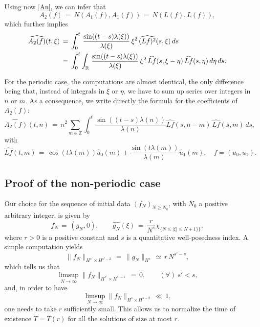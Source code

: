 \documentclass{amsart}
\begin{document}
Using now \eqref{An}, we can infer that
\[
A_2(f)\,=\,N(A_1(f),A_1(f))\,=\,N(L(f),L(f)),\]
which further implies
\begin{equation}
\aligned
\widehat{A_2(f)}(t,\xi)\,&=\,\int_0^t\,\frac{\sin((t-s) \lambda(\xi))}{\lambda(\xi)}\, \xi^2\, \widehat{(Lf)^2}(s,\xi)\,ds\\
&=\,\int_0^t \int_{\mathbb{R}}\,\frac{\sin((t-s) \lambda(\xi))}{\lambda(\xi)}\, \xi^2\, \widehat{Lf}(s,\xi-\eta)\,\widehat{Lf}(s,\eta)\,d\eta\,ds.\endaligned
\label{A2f}
\end{equation}

For the periodic case, the computations are almost identical, the only difference being that, instead of integrals in $\xi$ or $\eta$, we have to sum up series over integers in $n$ or $m$. As a consequence, we write directly the formula for the coefficients of $A_2(f)$:
\begin{equation}
\widehat{A_2(f)}(t,n)\,=\, n^2 \sum_{m\in\mathbb{Z}} \int_0^t \frac{\sin((t-s) \lambda(n))}{\lambda(n)} \widehat{Lf}(s,n-m)\,\widehat{Lf}(s,m)\,ds,
\label{A2p}\end{equation}
with
\[
\widehat{Lf}(t,m)\,=\,\cos(t \lambda(m)) \hat{u}_0(m)+\frac{\sin(t \lambda(m))}{\lambda(m)} \hat{u}_1(m),\quad f=(u_0,u_1).\]


\subsection{Proof of the non-periodic case} Our choice for the sequence of initial data $(f_N)_{N\geq N_0}$, with $N_0$ a positive arbitrary integer, is given by
\begin{equation}
f_N\,=\,(g_N, 0), \qquad \widehat{g_N}(\xi)\,=\,\frac{r}{N^s} \chi_{\{N \leq |\xi| \leq N + 1\}\}},
\label{fn}
\end{equation}
where $r>0$ is a positive constant and $s$ is a quantitative well-posedness index. A simple computation yields
\begin{equation}
\|f_N\|_{H^{s'}\times H^{s'-2}}\,=\,\|g_N\|_{H^s}\,\simeq\,r\,N^{s'-s},
\label{hsfn}
\end{equation}
which tells us that
\[
\limsup_{N\to \infty} \|f_N\|_{H^{s'} \times H^{s' -2}}\,=\,0, \qquad (\forall)\ s'<s, 
\]
and, in order to have 
\[
\limsup_{N\to \infty} \|f_N\|_{H^s \times H^{s -2}}\,\ll\,1,
\]
one needs to take $r$ sufficiently small. This allows us to normalize the time of existence $T=T(r)$ for all the solutions of size at most $r$.
\end{document}
